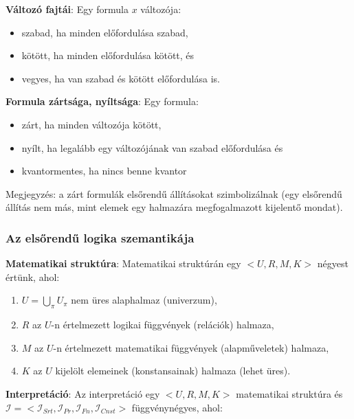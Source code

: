 \documentclass[margin=0px]{article}
\begin{document}
	\noindent \textbf{Változó fajtái}: Egy formula $x$ változója:
	
	\begin{itemize}
		\item	szabad, ha minden előfordulása szabad,
		
		\item	kötött, ha minden előfordulása kötött, és
		
		\item	vegyes, ha van szabad és kötött előfordulása is. 
	\end{itemize}
	
	\noindent \textbf{Formula zártsága, nyíltsága}: Egy formula:
	
	\begin{itemize}
		\item	zárt, ha minden változója kötött,
		
		\item	nyílt, ha legalább egy változójának van szabad előfordulása és
		
		\item	kvantormentes, ha nincs benne kvantor
	\end{itemize}
	
	Megjegyzés: a zárt formulák elsőrendű állításokat szimbolizálnak (egy elsőrendű állítás nem más, mint elemek egy halmazára
	megfogalmazott kijelentő mondat).
	
	\subsubsection{Az elsőrendű logika szemantikája}
	
	\noindent \textbf{Matematikai struktúra}: Matematikai struktúrán egy $<U, R, M, K>$ négyest értünk, ahol:
	
	\begin{enumerate}
		\item	$U = \bigcup_{\pi} U_{\pi}$ nem üres alaphalmaz (univerzum),
		
		\item	$R$ az $U$-n értelmezett logikai függvények (relációk) halmaza,
		
		\item	$M$ az $U$-n értelmezett matematikai függvények (alapműveletek) halmaza,
		
		\item	$K$ az $U$ kijelölt elemeinek (konstansainak) halmaza (lehet üres).
	\end{enumerate}
	
	\noindent \textbf{Interpretáció}: Az interpretáció egy $<U, R, M, K>$ matematikai struktúra és
	$\mathcal{I} = <\mathcal{I}_{Srt}, \mathcal{I}_{Pr}, \mathcal{I}_{Fn}, \mathcal{I}_{Cnst}>$
	függvénynégyes, ahol:
	
\end{document}

